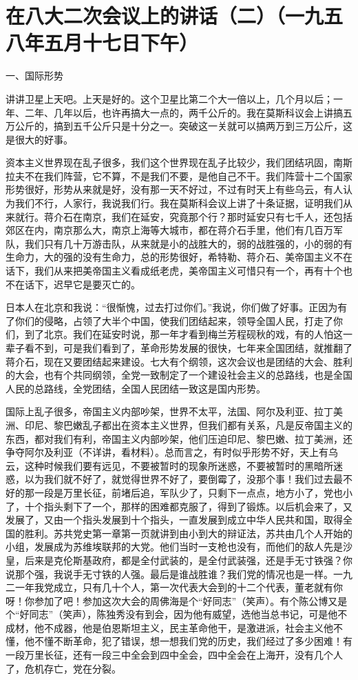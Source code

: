 \section[在八大二次会议上的讲话（二）（一九五八年五月十七日下午）]{在八大二次会议上的讲话（二）（一九五八年五月十七日下午）}


一、国际形势

讲讲卫星上天吧。上天是好的。这个卫星比第二个大一倍以上，几个月以后；一年、二年、几年以后，也许再搞大一点的，两千公斤的。我在莫斯科议会上讲搞五万公斤的，搞到五千公斤只是十分之一。突破这一关就可以搞两万到三万公斤，这是很大的好事。

资本主义世界现在乱子很多，我们这个世界现在乱子比较少，我们团结巩固，南斯拉夫不在我们阵营，它不算，不是我们不要，是他自己不干。我们阵营十二个国家形势很好，形势从来就是好，没有那一天不好过，不过有时天上有些乌云，有人认为我们不行，人家行，我说我们行。我在莫斯科会议上讲了十条证据，证明我们从来就行。蒋介石在南京，我们在延安，究竟那个行？那时延安只有七千人，还包括郊区在内，南京那么大，南京上海等大城市，都在蒋介石手里，他们有几百万军队，我们只有几十万游击队，从来就是小的战胜大的，弱的战胜强的，小的弱的有生命力，大的强的没有生命力，总的形势很好，希特勒、蒋介石、美帝国主义不在话下，我们从来把美帝国主义看成纸老虎，美帝国主义可惜只有一个，再有十个也不在话下，迟早它是要灭亡的。

日本人在北京和我说：“很惭愧，过去打过你们。”我说，你们做了好事。正因为有了你们的侵略，占领了大半个中国，使我们团结起来，领导全国人民，打走了你们，到了北京。我们在延安时说，那一年才看到梅兰芳程砚秋的戏，有的人怕这一辈子看不到，可是我们看到了，革命形势发展的很快，七年来全国团结，就推翻了蒋介石，现在又要团结起来建设。七大有个纲领，这次会议也是团结的大会、胜利的大会，也有个共同纲领，全党一致制定了一个建设社会主义的总路线，也是全国人民的总路线，全党团结，全国人民团结一致这是国内形势。

国际上乱子很多，帝国主义内部吵架，世界不太平，法国、阿尔及利亚、拉丁美洲、印尼、黎巴嫩乱子都出在资本主义世界，但我们都有关系，凡是反帝国主义的东西，都对我们有利，帝国主义内部吵架，他们压迫印尼、黎巴嫩、拉丁美洲，还争夺阿尔及利亚（不详讲，看材料）。总而言之，有时似乎形势不好，天上有乌云，这种时候我们要有远见，不要被暂时的现象所迷惑，不要被暂时的黑暗所迷惑，以为我们就不好了，就觉得世界不好了，要倒霉了，没那个事！我们过去最不好的那一段是万里长征，前堵后追，军队少了，只剩下一点点，地方小了，党也小了，十个指头剩下了一个，那样的困难都克服了，得到了锻炼。以后机会来了，又发展了，又由一个指头发展到十个指头，一直发展到成立中华人民共和国，取得全国的胜利。苏共党史第一章第一页就讲到由小到大的辩证法，苏共由几个人开始的小组，发展成为苏维埃联邦的大党。他们当时一支枪也没有，而他们的敌人先是沙皇，后来是克伦斯基政府，都是全付武装的，是全付武装强，还是手无寸铁强？你说那个强，我说手无寸铁的人强。最后是谁战胜谁？我们党的情况也是一样。一九二一年我党成立，只有几十个人，第一次代表大会到的十二个代表，董老就有你呀！你参加了吧！参加这次大会的周佛海是个“好同志”（笑声）。有个陈公博又是个“好同志”（笑声），陈独秀没有到会，因为他有威望，选他当总书记，可是他不成材，他不成器，他是伯恩斯坦主义，民主革命他干，是激进派，社会主义他不懂，他不懂不断革命，犯了错误，想一想我们党的历史，我们经过了多少困难！有一段万里长征，还有一段三中全会到四中全会，四中全会在上海开，没有几个人了，危机存亡，党在分裂。

